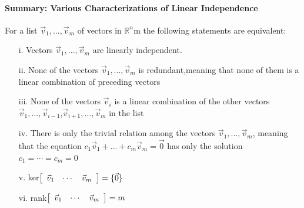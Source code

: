 \documentclass[10pt]{report}
\begin{document}
\paragraph{Summary: Various Characterizations of Linear Independence}
For a list $\vec{v}_1, ..., \vec{v}_m$ of vectors in $\mathbb{R}^n$m the following statements are equivalent:
\begin{itemize}
\item[i.] Vectors $\vec{v}_1, ..., \vec{v}_m$ are linearly independent.
\item[ii.] None of the vectors $\vec{v}_1, ..., \vec{v}_m$ is redundant,meaning that none of them is a linear combination of preceding vectors
\item[iii.] None of the vectors $\vec{v}_i$ is a linear combination of the other vectors $\vec{v}_1, ..., \vec{v}_{i-1}$,$\vec{v}_{i+1}, ..., \vec{v}_m$ in the list
\item[iv.] There is only the trivial relation among the vectors $\vec{v}_1, ..., \vec{v}_m$, meaning that the equation $c_1\vec{v}_1 + ...+ c_m\vec{v}_m=\vec{0}$ has only the solution $c_1=\cdots= c_m=0$
\item[v.]ker$\left[\begin{array}{c c c}
\vec{v}_1 & \cdots & \vec{v}_m
\end{array}\right]=\{\vec{0}\}$
\item[vi.]rank$\left[\begin{array}{c c c}
\vec{v}_1 & \cdots & \vec{v}_m
\end{array}\right]=m$
\end{itemize}
\end{document}
